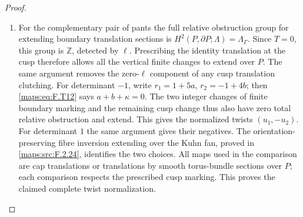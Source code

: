 \documentclass[11pt,a4paper]{article}
\numberwithin{equation}{section}
\theoremstyle{definition}
\begin{document}
\begin{proof}
\begin{enumerate}[label=\arabic*.]
\item For the complementary pair of pants the full relative
obstruction group for extending boundary translation
sections is
$H^2(P,\partial P;\Lambda)=\Lambda_\Gamma$.
Since $T=0$, this group is $\mathbb Z$, detected by $\ell$.
Prescribing the identity translation at the cusp therefore
allows all the vertical finite changes to extend over $P$.
The same argument removes the zero-$\ell$ component of
any cusp translation clutching.
For determinant $-1$, write
$r_1=1+5a$, $r_2=-1+4b$; then \eqref{maps:eq:F.T12} says
$a+b+\kappa=0$.
The two integer changes of finite boundary marking and
the remaining cusp change thus also have zero total
relative obstruction and extend.
This gives the normalized twists $(u_1,-u_2)$.
For determinant $1$ the same argument gives their negatives.
The orientation-preserving fibre inversion extending over
the Kuhn fan, proved in \ref{maps:src:F.2.24}, identifies the two choices.
All maps used in the comparison are cap translations or
translations by smooth torus-bundle sections over $P$;
each comparison respects the prescribed cusp marking.
This proves the claimed complete twist normalization.

\end{enumerate}
\end{proof}
\end{document}
